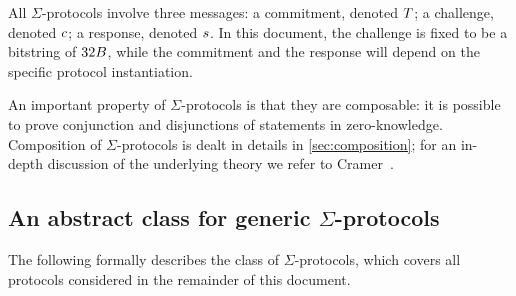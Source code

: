 \documentclass[11pt]{article}
\begin{document}
All $\Sigma$-protocols involve three messages: a commitment, denoted $T$; a challenge, denoted $c$; a response, denoted $s$.
In this document, the challenge is fixed to be a bitstring of $32B$,
while the commitment and the response will depend on the specific protocol instantiation.

An important property of $\Sigma$-protocols is that they are composable: it is possible to prove conjunction and disjunctions of statements in zero-knowledge.
Composition of $\Sigma$-protocols is dealt in details in \cref{sec:composition}; for an in-depth discussion of the underlying theory we refer to Cramer~\cite{cramer97}.

\subsection{An abstract class for generic $\Sigma$-protocols}
The following formally describes the class of $\Sigma$-protocols, which covers all protocols considered in the remainder of this document.
\end{document}
